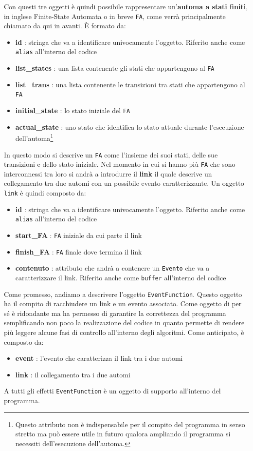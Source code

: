 Con questi tre oggetti è quindi possibile rappresentare un'\textbf{automa a stati finiti}, in inglese Finite-State Automata o in breve \texttt{FA}, come verrà principalmente chiamato da qui in avanti. È formato da:
\begin{itemize}
    \item \textbf{id} : stringa che va a identificare univocamente l'oggetto. Riferito anche come \texttt{alias} all'interno del codice
    \item \textbf{list\_states} : una lista contenente gli stati che appartengono al \texttt{FA}
    \item \textbf{list\_trans} : una lista contenente le transizioni tra stati che appartengono al \texttt{FA}
    \item \textbf{initial\_state} : lo stato iniziale del \texttt{FA}
    \item \textbf{actual\_state} : uno stato che identifica lo stato attuale durante l'esecuzione dell'automa\footnote{Questo attributo non è indispensabile per il compito del programma in senso stretto ma può essere utile in futuro qualora ampliando il programma si necessiti dell'esecuzione dell'automa.}
\end{itemize}
In questo modo si descrive un \texttt{FA} come l'insieme dei suoi stati, delle sue transizioni e dello stato iniziale. 
Nel momento in cui si hanno più \texttt{FA} che sono interconnessi tra loro si andrà a introdurre il \textbf{link} il quale descrive un collegamento tra due automi con un possibile evento caratterizzante. Un oggetto \texttt{link} è quindi composto da:
\begin{itemize}
    \item \textbf{id} : stringa che va a identificare univocamente l'oggetto. Riferito anche come \texttt{alias} all'interno del codice
    \item \textbf{start\_FA} : \texttt{FA} iniziale da cui parte il link
    \item \textbf{finish\_FA} : \texttt{FA} finale dove termina il link
    \item \textbf{contenuto} : attributo che andrà a contenere un \texttt{Evento} che va a caratterizzare il link. Riferito anche come \texttt{buffer} all'interno del codice
\end{itemize}
Come promesso, andiamo a descrivere l'oggetto \texttt{EventFunction}. Questo oggetto ha il compito di racchiudere un link e un evento associato. Come oggetto di per sé è ridondante ma ha permesso di garantire la correttezza del programma semplificando non poco la realizzazione del codice in quanto permette di rendere più leggere alcune fasi di controllo all'interno degli algoritmi. 
Come anticipato, è composto da:
\begin{itemize}
    \item \textbf{event} : l'evento che caratterizza il link tra i due automi
    \item \textbf{link} : il collegamento tra i due automi
\end{itemize}
A tutti gli effetti \texttt{EventFunction} è un oggetto di supporto all'interno del programma.

